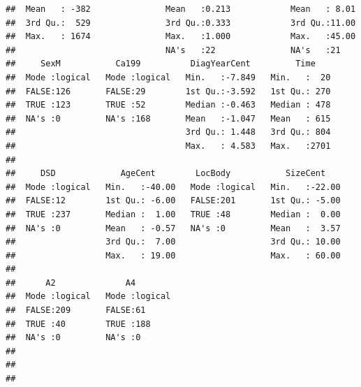 \documentclass{article}\usepackage[]{graphicx}\usepackage[]{color}
\makeatletter
\newenvironment{kframe}{%
 \def\at@end@of@kframe{}%
 \ifinner\ifhmode%
  \def\at@end@of@kframe{\end{minipage}}%
  \begin{minipage}{\columnwidth}%
 \fi\fi%
 \def\FrameCommand##1{\hskip\@totalleftmargin \hskip-\fboxsep
 \colorbox{shadecolor}{##1}\hskip-\fboxsep
     \hskip-\linewidth \hskip-\@totalleftmargin \hskip\columnwidth}%
 \MakeFramed {\advance\hsize-\width
   \@totalleftmargin\z@ \linewidth\hsize
   \@setminipage}}%
 {\par\unskip\endMakeFramed%
 \at@end@of@kframe}
\newenvironment{knitrout}{}{} %
\makeatother
\begin{document}
\begin{knitrout}
\begin{kframe}
\begin{verbatim}
##  Mean   : -382               Mean   :0.213            Mean   : 8.01   
##  3rd Qu.:  529               3rd Qu.:0.333            3rd Qu.:11.00   
##  Max.   : 1674               Max.   :1.000            Max.   :45.00   
##                              NA's   :22               NA's   :21      
##     SexM           Ca199          DiagYearCent         Time     
##  Mode :logical   Mode :logical   Min.   :-7.849   Min.   :  20  
##  FALSE:126       FALSE:29        1st Qu.:-3.592   1st Qu.: 270  
##  TRUE :123       TRUE :52        Median :-0.463   Median : 478  
##  NA's :0         NA's :168       Mean   :-1.047   Mean   : 615  
##                                  3rd Qu.: 1.448   3rd Qu.: 804  
##                                  Max.   : 4.583   Max.   :2701  
##                                                                 
##     DSD             AgeCent        LocBody           SizeCent     
##  Mode :logical   Min.   :-40.00   Mode :logical   Min.   :-22.00  
##  FALSE:12        1st Qu.: -6.00   FALSE:201       1st Qu.: -5.00  
##  TRUE :237       Median :  1.00   TRUE :48        Median :  0.00  
##  NA's :0         Mean   : -0.57   NA's :0         Mean   :  3.57  
##                  3rd Qu.:  7.00                   3rd Qu.: 10.00  
##                  Max.   : 19.00                   Max.   : 60.00  
##                                                                   
##      A2              A4         
##  Mode :logical   Mode :logical  
##  FALSE:209       FALSE:61       
##  TRUE :40        TRUE :188      
##  NA's :0         NA's :0        
##                                 
##                                 
## 
\end{verbatim}
\end{kframe}
\end{knitrout}


\end{document}
